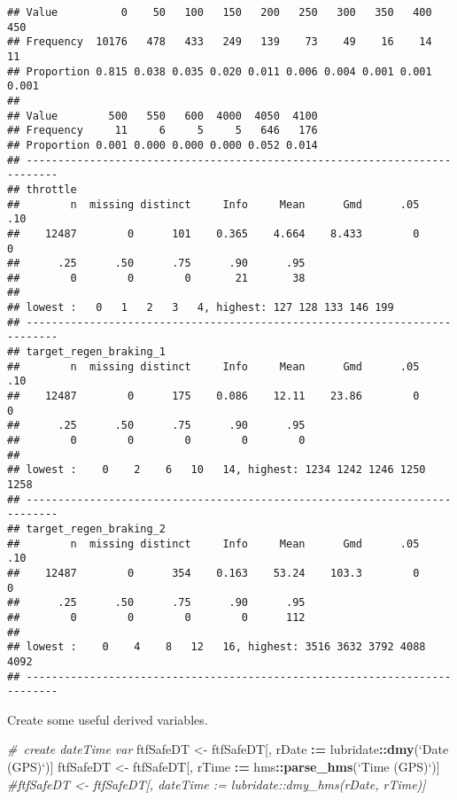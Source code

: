 \documentclass[]{article}
\newenvironment{Shaded}{\begin{snugshade}}{\end{snugshade}}
\newcommand{\KeywordTok}[1]{\textcolor[rgb]{0.13,0.29,0.53}{\textbf{#1}}}
\newcommand{\DataTypeTok}[1]{\textcolor[rgb]{0.13,0.29,0.53}{#1}}
\newcommand{\StringTok}[1]{\textcolor[rgb]{0.31,0.60,0.02}{#1}}
\newcommand{\CommentTok}[1]{\textcolor[rgb]{0.56,0.35,0.01}{\textit{#1}}}
\newcommand{\OperatorTok}[1]{\textcolor[rgb]{0.81,0.36,0.00}{\textbf{#1}}}
\newcommand{\ErrorTok}[1]{\textcolor[rgb]{0.64,0.00,0.00}{\textbf{#1}}}
\newcommand{\NormalTok}[1]{#1}
\begin{document}
\begin{verbatim}
## Value          0    50   100   150   200   250   300   350   400   450
## Frequency  10176   478   433   249   139    73    49    16    14    11
## Proportion 0.815 0.038 0.035 0.020 0.011 0.006 0.004 0.001 0.001 0.001
##                                               
## Value        500   550   600  4000  4050  4100
## Frequency     11     6     5     5   646   176
## Proportion 0.001 0.000 0.000 0.000 0.052 0.014
## ---------------------------------------------------------------------------
## throttle 
##        n  missing distinct     Info     Mean      Gmd      .05      .10 
##    12487        0      101    0.365    4.664    8.433        0        0 
##      .25      .50      .75      .90      .95 
##        0        0        0       21       38 
## 
## lowest :   0   1   2   3   4, highest: 127 128 133 146 199
## ---------------------------------------------------------------------------
## target_regen_braking_1 
##        n  missing distinct     Info     Mean      Gmd      .05      .10 
##    12487        0      175    0.086    12.11    23.86        0        0 
##      .25      .50      .75      .90      .95 
##        0        0        0        0        0 
## 
## lowest :    0    2    6   10   14, highest: 1234 1242 1246 1250 1258
## ---------------------------------------------------------------------------
## target_regen_braking_2 
##        n  missing distinct     Info     Mean      Gmd      .05      .10 
##    12487        0      354    0.163    53.24    103.3        0        0 
##      .25      .50      .75      .90      .95 
##        0        0        0        0      112 
## 
## lowest :    0    4    8   12   16, highest: 3516 3632 3792 4088 4092
## ---------------------------------------------------------------------------
\end{verbatim}

Create some useful derived variables.

\begin{Shaded}
\begin{Highlighting}[]
\CommentTok{# create dateTime var}
\NormalTok{ftfSafeDT <-}\StringTok{ }\NormalTok{ftfSafeDT[, rDate }\OperatorTok{:}\ErrorTok{=}\StringTok{ }\NormalTok{lubridate}\OperatorTok{::}\KeywordTok{dmy}\NormalTok{(}\StringTok{`}\DataTypeTok{Date (GPS)}\StringTok{`}\NormalTok{)]}
\NormalTok{ftfSafeDT <-}\StringTok{ }\NormalTok{ftfSafeDT[, rTime }\OperatorTok{:}\ErrorTok{=}\StringTok{ }\NormalTok{hms}\OperatorTok{::}\KeywordTok{parse_hms}\NormalTok{(}\StringTok{`}\DataTypeTok{Time (GPS)}\StringTok{`}\NormalTok{)]}
\CommentTok{#ftfSafeDT <- ftfSafeDT[, dateTime := lubridate::dmy_hms(rDate, rTime)]}
\end{Highlighting}
\end{Shaded}
\end{document}
